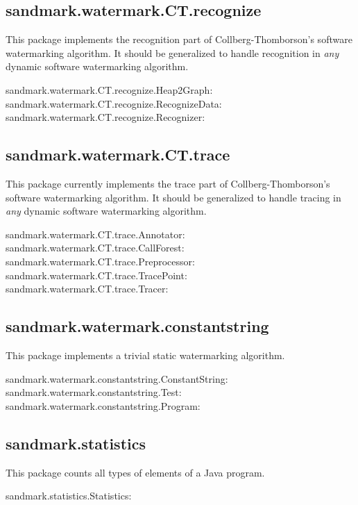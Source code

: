 \subsection{sandmark.watermark.CT.recognize}
This package implements the recognition part
of Collberg-Thomborson's software watermarking
algorithm. It should be generalized to handle
recognition in {\em any} dynamic software
watermarking algorithm.
\begin{description}
   \item[sandmark.watermark.CT.recognize.Heap2Graph:]
   \item[sandmark.watermark.CT.recognize.RecognizeData:]
   \item[sandmark.watermark.CT.recognize.Recognizer:]
\end{description}

\subsection{sandmark.watermark.CT.trace}
This package currently implements the trace part
of Collberg-Thomborson's software watermarking
algorithm. It should be generalized to handle
tracing in {\em any} dynamic software
watermarking algorithm.
\begin{description}
   \item[sandmark.watermark.CT.trace.Annotator:]
   \item[sandmark.watermark.CT.trace.CallForest:]
   \item[sandmark.watermark.CT.trace.Preprocessor:]
   \item[sandmark.watermark.CT.trace.TracePoint:]
   \item[sandmark.watermark.CT.trace.Tracer:]
\end{description}

\subsection{sandmark.watermark.constantstring}
This package implements a trivial static watermarking
algorithm.
\begin{description}
   \item[sandmark.watermark.constantstring.ConstantString:]
   \item[sandmark.watermark.constantstring.Test:]
   \item[sandmark.watermark.constantstring.Program:]
\end{description}

\subsection{sandmark.statistics}
This package counts all types of elements of a
Java program.
\begin{description}
   \item[sandmark.statistics.Statistics:]
\end{description}
